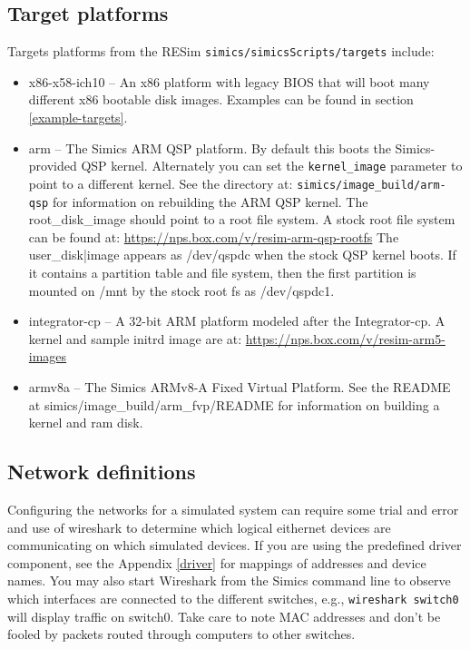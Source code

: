 \documentclass[titlepage]{article}
\begin{document}
\subsection{Target platforms}
\label{target-platforms}
Targets platforms from the RESim {\tt simics/simicsScripts/targets} include:
\begin{itemize}
\item x86-x58-ich10 -- An x86 platform with legacy BIOS that will boot many different x86 bootable disk images. Examples can be found in
section \ref{example-targets}.
\item arm -- The Simics ARM QSP platform.  By default this boots the Simics-provided QSP kernel.  Alternately you can set the {\tt kernel\_image} 
parameter to point to a different kernel.  See the directory at:
\newline
{\tt simics/image\_build/arm-qsp} for information on rebuilding the ARM QSP kernel.  The root\_disk\_image should point to a root file system.
A stock root file system can be found at: 
\newline
\url{https://nps.box.com/v/resim-arm-qsp-rootfs}
The user\_disk|image appears as /dev/qspdc when the stock QSP kernel boots.  If it contains a partition table and file system, then the first
partition is mounted on /mnt by the stock root fs as /dev/qspdc1.

\item integrator-cp -- A 32-bit ARM platform modeled after the Integrator-cp.  A kernel and sample initrd image are at:
\newline
\url{https://nps.box.com/v/resim-arm5-images}

\item armv8a -- The Simics ARMv8-A Fixed Virtual Platform.  See the README at simics/image\_build/arm\_fvp/README for information on building a kernel
and ram disk.
\end{itemize}


\subsection{Network definitions}
\label{networks}
Configuring the networks for a simulated system can require some trial and error and use of wireshark to determine which
logical eithernet devices are communicating on which simulated devices.  If you are using the predefined driver component, see the 
Appendix \ref{driver} for mappings of addresses and device names.  You may also start Wireshark from the Simics command line to 
observe which interfaces are connected to the different switches, e.g., {\tt wireshark switch0} will display traffic on switch0.
Take care to note MAC addresses and don't be fooled by packets routed through computers to other switches.
\end{document}
